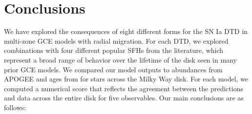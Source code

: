 \documentclass[twocolumn,twocolappendix,linenumbers]{aastex631}
\newcommand{\todo}[1]{{\color{red}#1}}
\begin{document}


\section{Conclusions}
\label{sec:conclusions}

We have explored the consequences of eight different forms for the SN Ia DTD in multi-zone GCE models with radial migration. For each DTD, we explored combinations with four different popular SFHs from the literature, which represent a broad range of behavior over the lifetime of the disk seen in many prior GCE models.
We compared our model outputs to abundances from APOGEE and ages from  for stars across the Milky Way disk. For each model, we computed a numerical score that reflects the agreement between the predictions and data across the entire disk for five observables. Our main conclusions are as follows:

\end{document}
